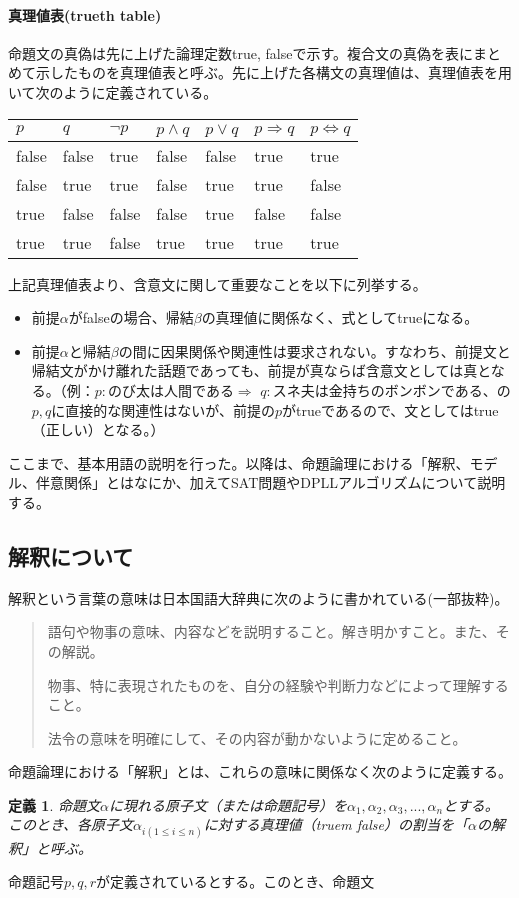 \documentclass[dvipdfmx]{jsarticle}
\newtheorem{dfn}{定義}
\begin{document}
  \paragraph{真理値表(trueth table)}
  命題文の真偽は先に上げた論理定数true, falseで示す。複合文の真偽を表にまとめて示したものを真理値表と呼ぶ。先に上げた各構文の真理値は、真理値表を用いて次のように定義されている。
  \begin{table}[H]
    \centering
\begin{tabular}{|l|l||l|l|l|l|l|} \hline
  $p$   & $q$   & $\neg p$ & $p \wedge q$ & $p \vee q$ & $p \Rightarrow q$ & $p \Leftrightarrow q$ \\ \hline
  false & false & true     & false        & false      & true              & true                \\ \hline
  false & true  & true     & false        & true       & true              & false               \\ \hline
  true  & false & false    & false        & true       & false             & false               \\ \hline
  true  & true  & false    & true         & true       & true              & true \\ \hline
\end{tabular}
\end{table}
上記真理値表より、含意文に関して重要なことを以下に列挙する。
\begin{itemize}
    \item 前提$\alpha$がfalseの場合、帰結$\beta$の真理値に関係なく、式としてtrueになる。
    \item 前提$\alpha$と帰結$\beta$の間に因果関係や関連性は要求されない。すなわち、前提文と帰結文がかけ離れた話題であっても、前提が真ならば含意文としては真となる。（例：$p:$のび太は人間である$\Rightarrow$ $q:$スネ夫は金持ちのボンボンである、の$p,q$に直接的な関連性はないが、前提の$p$がtrueであるので、文としてはtrue（正しい）となる。）
\end{itemize}
ここまで、基本用語の説明を行った。以降は、命題論理における「解釈、モデル、伴意関係」とはなにか、加えてSAT問題やDPLLアルゴリズムについて説明する。
\subsection{解釈について}
解釈という言葉の意味は日本国語大辞典に次のように書かれている(一部抜粋)。
\begin{quote}
  語句や物事の意味、内容などを説明すること。解き明かすこと。また、その解説。\par
  物事、特に表現されたものを、自分の経験や判断力などによって理解すること。\par
  法令の意味を明確にして、その内容が動かないように定めること。
\end{quote}
命題論理における「解釈」とは、これらの意味に関係なく次のように定義する。
\begin{dfn}
  命題文$\alpha$に現れる原子文（または命題記号）を$\alpha_{1},\alpha_{2},\alpha_{3},...,\alpha_{n}$とする。このとき、各原子文$\alpha_{i(1 \leq i \leq n)}$に対する真理値（truem false）の割当を「$\alpha$の解釈」と呼ぶ。
\end{dfn}
命題記号$p, q, r$が定義されているとする。このとき、命題文
\end{document}
